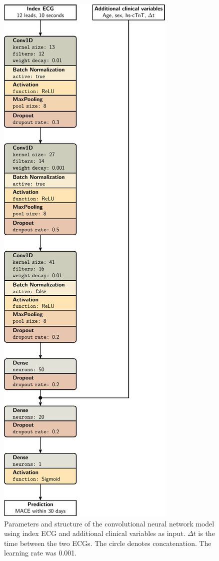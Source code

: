 \documentclass[preprint]{elsarticle}
\begin{document}
\begin{figure}[H]
\centering
\includegraphics[scale=\modelscale,keepaspectratio,trim=-16em 0 0 0]{figures/model-cnn3.pdf}
\caption{Parameters and structure of the convolutional neural network model using index ECG and additional clinical variables as input. $\Delta t$ is the time between the two ECGs. The circle denotes concatenation. The learning rate was 0.001.}
\end{figure}
\end{document}
